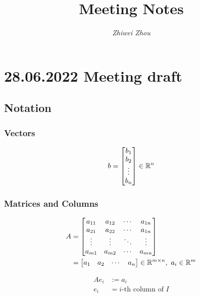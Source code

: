 \documentclass[11pt]{article}
\title{\textbf{Meeting Notes}}
\author{\textit{Zhiwei Zhou}}
\begin{document}
\maketitle

\section{28.06.2022 Meeting draft}

\subsection{Notation}

\subsubsection*{Vectors}

\begin{align*}
    b = \mqty[
        b_{1} \\
        b_{2} \\
        \vdots \\
        b_{n}
        ]
    \in \mathbb{R}^n
\end{align*}


\subsubsection*{Matrices and Columns}

\begin{align*}
    A &= \mqty[
        a_{11} & a_{12} & \cdots & a_{1n} \\
        a_{21} & a_{22} & \cdots & a_{1n} \\
        \vdots & \vdots & \ddots & \vdots \\
        a_{m1} & a_{m2} & \cdots & a_{mn}
        ]\\
    &= \mqty[
        a_{1} & a_{2} & \cdots & a_{n}
        ]
    \in \mathbb{R}^{m \times n}
    ,\ a_{i} \in \mathbb{R}^{m}
\end{align*}

\begin{align*}
    Ae_{i} &:= a_{i}\\
    e_{i} &= i\text{-th column of }I\\
\end{align*}
\end{document}
